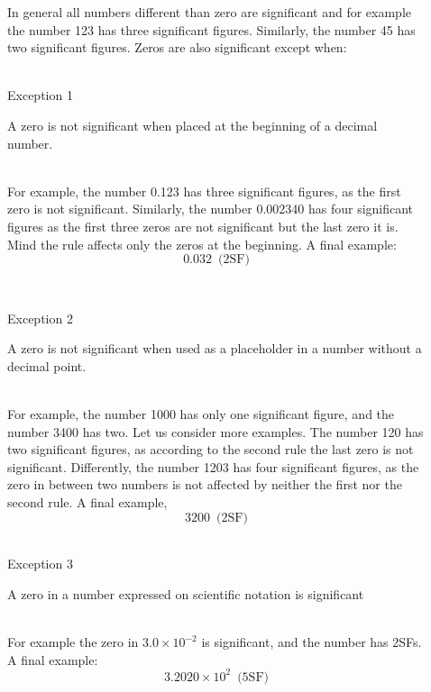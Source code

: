 \documentclass[main.tex]{subfiles}
\begin{document}
\begin{description}
\item[] In general all numbers different than zero are significant and for example the number 123 has three significant figures. Similarly, the number 45 has two significant figures. Zeros are also significant except when:\\
 \faCodeFork\ \begin{bf}Exception 1\end{bf}  \begin{it}A zero is not significant when placed at the beginning of a decimal number. \end{it} \\
 For example, the number 0.123 has three significant figures, as the first zero is not significant. Similarly, the number 0.002340 has four significant figures as the first three zeros are not significant but the last zero it is. Mind the rule affects only the zeros at the beginning. A final example:
 \begin{equation*}
   0.032 \enspace \text{(2SF)}  
\end{equation*}

 \faCodeFork\ \begin{bf}Exception 2\end{bf} \begin{it}A zero is not significant when used as a placeholder in a number without a decimal point. \end{it} \\
 For example, the number 1000 has only one significant figure, and the number 3400 has two. Let us consider more examples. The number 120 has two significant figures, as according to the second rule the last zero is not significant. Differently, the number 1203 has four significant figures, as the zero in between two numbers is not affected by neither the first nor the second rule. A final example,
  \begin{equation*}
   3200 \enspace \text{(2SF)}  
\end{equation*}
\faCodeFork\ \begin{bf}Exception 3\end{bf} \begin{it}A zero in a number expressed on scientific notation is significant \end{it} \\
 For example the zero  in $3.0\times 10^{-2}$ is significant, and the number has 2SFs. A final example:
  \begin{equation*}
   3.2020\times 10^{2} \enspace \text{(5SF)}  
\end{equation*}




\end{description}
\end{document}
